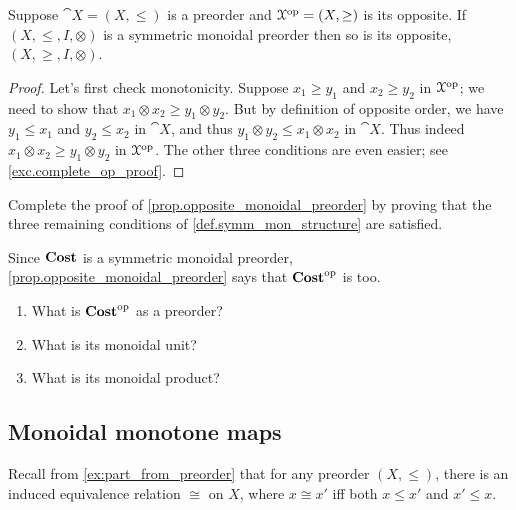 \documentclass[7Sketches]{subfiles}
\begin{document}
\begin{proposition}%
\label{prop.opposite_monoidal_preorder}%
  Suppose $\cat{X}=(X,\leq)$ is a preorder and $\mathcal{X}^{\textnormal{op}}=(X,\geq)$ is its opposite. If $(X,\leq,I,\otimes)$ is a symmetric monoidal preorder then so is its opposite, $(X,\geq,I,\otimes)$.
\end{proposition}
\begin{proof}
  Let's first check monotonicity. Suppose $x_1\geq y_1$ and $x_2\geq y_2$ in
  $\mathcal{X}^{\textnormal{op}}$; we need to show that $x_1\otimes x_2\geq y_1\otimes y_2$. But by
  definition of opposite order, we have $y_1\leq x_1$ and $y_2\leq x_2$ in
  $\cat{X}$, and thus $y_1\otimes y_2\leq x_1\otimes x_2$ in $\cat{X}$. Thus
  indeed $x_1\otimes x_2\geq y_1\otimes y_2$ in $\mathcal{X}^{\textnormal{op}}$. The other three
  conditions are even easier; see \cref{exc.complete_op_proof}.
\end{proof}

\begin{exercise}%
\label{exc.complete_op_proof}
  Complete the proof of \cref{prop.opposite_monoidal_preorder} by proving that the three remaining conditions of \cref{def.symm_mon_structure} are satisfied.
\end{exercise}

\begin{exercise} %
\label{exc.costop}
  Since $\mathbf{Cost}$ is a symmetric monoidal preorder, \cref{prop.opposite_monoidal_preorder} says that $\mathbf{Cost}^{\textnormal{op}}$ is too.
  \begin{enumerate}
    \item What is $\mathbf{Cost}^{\textnormal{op}}$ as a preorder?
    \item What is its monoidal unit?
    \item What is its monoidal product?
  \qedhere
\end{enumerate}
\end{exercise}

\subsection{Monoidal monotone maps}%
Recall from \cref{ex:part_from_preorder} that for any preorder $(X,\leq)$, there is
an induced equivalence relation $\cong$ on $X$, where $x\cong x'$ iff both
$x\leq x'$ and $x'\leq x$.%
\end{document}
